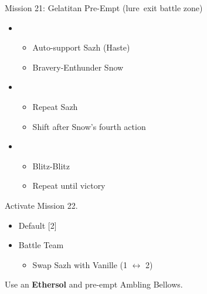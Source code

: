 	\begin{battle}[0:37]{Mission 21: Gelatitan Pre-Empt (lure\, exit battle zone)}
		\begin{itemize}
			\item \third
			      \begin{itemize}
				      \item Auto-support Sazh (Haste)
				      \item Bravery-Enthunder Snow
			      \end{itemize}
			\item \first
			      \begin{itemize}
				      \item Repeat Sazh
				      \item Shift after Snow's fourth action
			      \end{itemize}
			\item \fourth
			      \begin{itemize}
				      \item Blitz-Blitz
				      \item Repeat until victory
			      \end{itemize}
		\end{itemize}
	\end{battle}

Activate Mission 22.

\begin{menu}
	\begin{itemize}
		\paradigm
		\begin{itemize}
			\item Default [2]
			\item Battle Team
				\begin{itemize}
					\item Swap Sazh with Vanille (1 $\leftrightarrow$ 2)
				\end{itemize}						      			      	
		\end{itemize}
	\end{itemize}
\end{menu}

Use an \textbf{Ethersol} and pre-empt Ambling Bellows.

\renewcommand{\second}{[2] Relentless Assault (\rav/\com/\rav)}

